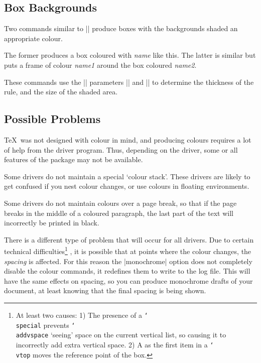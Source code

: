 \subsection{Box Backgrounds}
Two commands similar to |\fbox| produce boxes with the backgrounds
shaded an appropriate colour.



The former produces a box coloured with \emph{name}
\colorbox{mygrey}{like this}. The latter is similar but puts a frame of
colour \emph{name1} around the box coloured \emph{name2}.

These commands use the |\fbox| parameters |\fboxrule| and |\fboxsep|
to determine the thickness of the rule, and the size of the shaded area.

\subsection{Possible Problems}

\TeX\ was not designed with colour in mind, and producing colours
requires a lot of help from the driver program. Thus, depending on the
driver, some or all features of the  package may not be
available.

Some drivers do not maintain a special `colour stack'. These drivers are
likely to get confused if you nest colour changes, or use colours in
floating environments.

Some drivers do not maintain colours over a page break, so that if the
page breaks in the middle of a coloured paragraph, the last part of the
text will incorrectly be printed in black.

There is a different type of problem that will occur for all drivers.
Due to certain technical difficulties\footnote{At least two causes:
1) The presence of a \texttt{\char`\\special}  prevents
\texttt{\char`\\addvspace} `seeing' space on the current vertical list,
so causing it to incorrectly add extra vertical space. 2) A
 as the first item in a \texttt{\char`\\vtop} moves the
reference point of the box.}%
, it is possible that at points
where the colour changes, the \emph{spacing} is affected. For this
reason the |monochrome| option does not completely disable the colour
commands, it redefines them to write to the log file. This will have the
same effects on spacing, so you can produce monochrome drafts of your
document, at least knowing that the final spacing is being shown.

